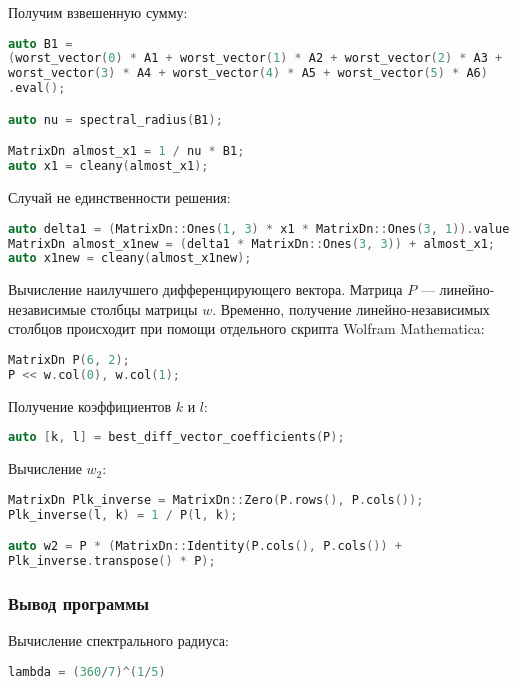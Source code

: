 \documentclass[specialist,
  substylefile = spbu.rtx,
  href,
  colorlinks=true,
  12pt]{disser}
\begin{document}
Получим взвешенную сумму:
\begin{lstlisting}[language=c++,basicstyle=\footnotesize\ttfamily]
auto B1 =
(worst_vector(0) * A1 + worst_vector(1) * A2 + worst_vector(2) * A3 +
worst_vector(3) * A4 + worst_vector(4) * A5 + worst_vector(5) * A6)
.eval();

auto nu = spectral_radius(B1);

MatrixDn almost_x1 = 1 / nu * B1;
auto x1 = cleany(almost_x1);
\end{lstlisting}

Случай не единственности решения:
\begin{lstlisting}[language=c++,basicstyle=\footnotesize\ttfamily]
auto delta1 = (MatrixDn::Ones(1, 3) * x1 * MatrixDn::Ones(3, 1)).value();
MatrixDn almost_x1new = (delta1 * MatrixDn::Ones(3, 3)) + almost_x1;
auto x1new = cleany(almost_x1new);
\end{lstlisting}


Вычисление наилучшего дифференцирующего вектора.
Матрица $P$ --- линейно-независимые столбцы матрицы $w$.
Временно, получение линейно-независимых столбцов происходит
при помощи отдельного скрипта Wolfram Mathematica:
\begin{lstlisting}[language=c++,basicstyle=\footnotesize\ttfamily]
MatrixDn P(6, 2);
P << w.col(0), w.col(1);
\end{lstlisting}

Получение коэффициентов $k$ и $l$:
\begin{lstlisting}[language=c++,basicstyle=\footnotesize\ttfamily]
auto [k, l] = best_diff_vector_coefficients(P);
\end{lstlisting}


Вычисление $w_2$:
\begin{lstlisting}[language=c++,basicstyle=\footnotesize\ttfamily]
MatrixDn Plk_inverse = MatrixDn::Zero(P.rows(), P.cols());
Plk_inverse(l, k) = 1 / P(l, k);

auto w2 = P * (MatrixDn::Identity(P.cols(), P.cols()) +
Plk_inverse.transpose() * P);
\end{lstlisting}
	
\subsubsection{Вывод программы}

Вычисление  спектрального радиуса:
\begin{lstlisting}[language=c++,basicstyle=\footnotesize\ttfamily]
	lambda = (360/7)^(1/5)
\end{lstlisting}
\end{document}
